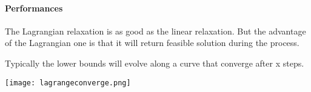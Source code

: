 \paragraph{Performances}

The Lagrangian relaxation is as good as the linear relaxation. But the
advantage of the Lagrangian one is that it will return feasible solution
during the process.

Typically the lower bounds will evolve along a curve that converge after x steps.

\centerline{\texttt{[image: lagrangeconverge.png]}}
